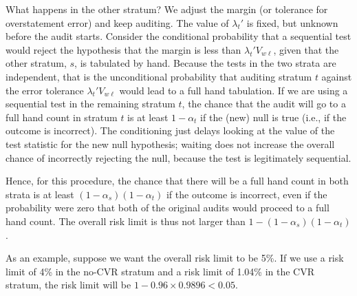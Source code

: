 What happens in the other stratum?
We adjust the margin (or tolerance for overstatement error) and keep auditing.
The value of $\lambda_t'$ is fixed, but unknown before the audit starts.
Consider the conditional probability that a sequential test would reject the hypothesis that the margin is less than $\lambda_t' V_{w\ell}$, given that the other stratum, $s$, is tabulated by hand.
Because the tests in the two strata are independent, that is the unconditional probability
that auditing stratum $t$ against the error tolerance $\lambda_t' V_{w\ell}$ would lead to a full
hand tabulation. 
If we are using a sequential test in the remaining stratum $t$, the chance that the audit will
go to a full hand count in stratum $t$ is at least $1-\alpha_t$ if the (new) null is true (i.e.,
if the outcome is incorrect). 
The conditioning just delays looking at the value of the test statistic for the new null hypothesis; waiting does not increase the overall chance of incorrectly rejecting the null, 
because the test is legitimately sequential.

Hence, for this procedure, the chance that there will be a full hand count in both strata is at least 
$(1-\alpha_s)(1-\alpha_t)$ if the outcome is incorrect,
even if the probability were zero that both of the original audits would proceed to a full hand count.
The overall risk limit is thus not larger than $1 - (1-\alpha_s)(1-\alpha_t)$.

As an example, suppose we want the overall risk limit to be 5\%. 
If we use a risk limit of 4\% in the no-CVR stratum and a risk limit of 1.04\% in the CVR stratum,
the risk limit will be $1 - 0.96\times 0.9896 < 0.05$.

